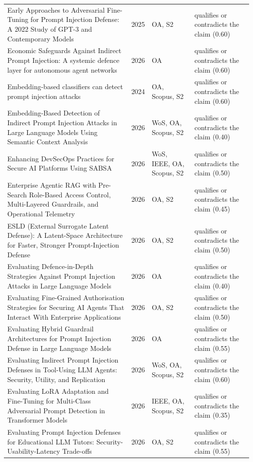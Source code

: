 \begin{longtable}{@{}%
  >{\raggedright\arraybackslash}p{}c%
  >{\raggedright\arraybackslash}p{}%
  >{\raggedright\arraybackslash}p{}@{}}
Early Approaches to Adversarial Fine-Tuning for Prompt Injection Defense: A 2022 Study of GPT-3 and Contemporary Models & 2025 & OA, S2 & qualifies or contradicts the claim (0.60) \\
Economic Safeguards Against Indirect Prompt Injection: A systemic defence layer for autonomous agent networks & 2026 & OA & qualifies or contradicts the claim (0.60) \\
Embedding-based classifiers can detect prompt injection attacks & 2024 & OA, Scopus, S2 & qualifies or contradicts the claim (0.60) \\
Embedding-Based Detection of Indirect Prompt Injection Attacks in Large Language Models Using Semantic Context Analysis & 2026 & WoS, OA, Scopus, S2 & qualifies or contradicts the claim (0.40) \\
Enhancing DevSecOps Practices for Secure AI Platforms Using SABSA & 2026 & WoS, IEEE, OA, Scopus, S2 & qualifies or contradicts the claim (0.50) \\
Enterprise Agentic RAG with Pre-Search Role-Based Access Control, Multi-Layered Guardrails, and Operational Telemetry & 2026 & OA, S2 & qualifies or contradicts the claim (0.45) \\
ESLD (External Surrogate Latent Defense): A Latent-Space Architecture for Faster, Stronger Prompt-Injection Defense & 2026 & OA, S2 & qualifies or contradicts the claim (0.50) \\
Evaluating Defence-in-Depth Strategies Against Prompt Injection Attacks in Large Language Models & 2026 & OA & qualifies or contradicts the claim (0.40) \\
Evaluating Fine-Grained Authorisation Strategies for Securing AI Agents That Interact With Enterprise Applications & 2026 & OA, S2 & qualifies or contradicts the claim (0.50) \\
Evaluating Hybrid Guardrail Architectures for Prompt Injection Defense in Large Language Models & 2026 & OA & qualifies or contradicts the claim (0.55) \\
Evaluating Indirect Prompt Injection Defenses in Tool-Using LLM Agents: Security, Utility, and Replication & 2026 & WoS, OA, Scopus, S2 & qualifies or contradicts the claim (0.60) \\
Evaluating LoRA Adaptation and Fine-Tuning for Multi-Class Adversarial Prompt Detection in Transformer Models & 2026 & IEEE, OA, Scopus, S2 & qualifies or contradicts the claim (0.35) \\
Evaluating Prompt Injection Defenses for Educational LLM Tutors: Security-Usability-Latency Trade-offs & 2026 & OA, S2 & qualifies or contradicts the claim (0.55) \\

\end{longtable}
